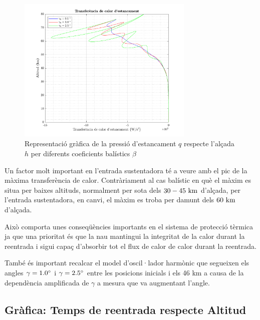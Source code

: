 \begin{figure}[ht]
    \centering
    \includegraphics[width=0.75\textwidth]{imagenes/02_lifting_graficas/transferencia_calor.pdf}
    \caption{Representació gràfica de la pressió d'estancament $q$ respecte l'alçada $h$ per diferents coeficients balístics $\beta$}
    \label{fig:transf_calor_lift}
\end{figure}

Un factor molt important en l'entrada sustentadora té a veure amb el pic de la màxima transferència de calor. Contràriament al cas balístic en què el màxim es situa per baixes altituds, normalment per sota dels $30 - 45 \ \kilo\meter$ d'alçada, per l'entrada sustentadora, en canvi, el màxim es troba per damunt dels $60 \ \kilo\meter$ d'alçada.

Això comporta unes conseqüències importants en el sistema de protecció tèrmica ja que una prioritat és que la nau mantingui la integritat de la calor durant la reentrada i sigui capaç d'absorbir tot el flux de calor de calor durant la reentrada.

També és important recalcar el model d'oscil·lador harmònic que segueixen els angles $\gamma = 1.0 \degrees$ i $\gamma = 2.5 \degrees$ entre les posicions inicials i els 46 km a causa de la dependència amplificada de $\gamma$ a mesura que va augmentant l'angle.

\newpage
\subsection{Gràfica: Temps de reentrada respecte Altitud}

